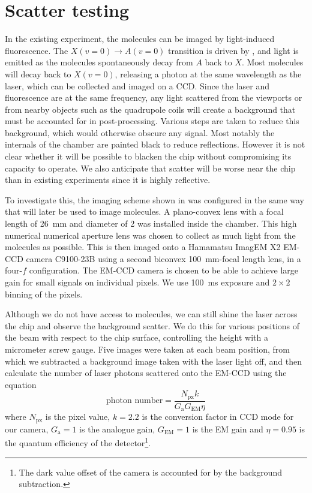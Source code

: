 \section{Scatter testing}
\label{exper:scatter}

In the existing \CaF{} experiment, the molecules can be imaged by light-induced
fluorescence.  The $X(v=0)\rightarrow A(v=0)$ transition is driven by
, and light is emitted as the molecules spontaneously decay from
$A$ back to $X$. Most molecules will decay back to $X(v=0)$, releasing a photon
at the same wavelength as the laser, which can be collected and imaged on a
CCD. Since the laser and fluorescence are at the same frequency, any light
scattered from the viewports or from nearby objects such as the quadrupole
coils will create a background that must be accounted for in post-processing.
Various steps are taken to reduce this background, which would otherwise
obscure any signal. Most notably the internals of the chamber are painted black
to reduce reflections. However it is not clear whether it will be possible to
blacken the chip without compromising its capacity to operate. We also
anticipate that scatter will be worse near the chip than in existing
experiments since it is highly reflective.

To investigate this, the imaging scheme shown in
 was configured in the same way that will later
be used to image molecules.  A plano-convex lens with a focal length of
\SI{26}{\milli\meter} and diameter of \SI{2}{\inch} was installed inside the
chamber. This high numerical numerical aperture lens was chosen to collect as
much light from the molecules as possible. This is then imaged onto a Hamamatsu
ImagEM X2 EM-CCD camera C9100-23B using a second biconvex
\SI{100}{\milli\meter}-focal length lens, in a four-$f$ configuration. The
EM-CCD camera is chosen to be able to achieve large gain for small signals on
individual pixels. We use \SI{100}{\milli\second} exposure and $2\times2$
binning of the pixels.

Although we do not have access to molecules, we can still shine the laser
across the chip and observe the background scatter. We do this for various
positions of the beam with respect to the chip surface, controlling the height
with a micrometer screw gauge. Five images were taken at each beam position,
from which we subtracted a background image taken with the laser light off, and
then calculate the number of laser photons scattered onto the EM-CCD using the
equation
%
\begin{equation}
  \text{photon number} = \frac{N_\text{px} k}{G_\text{a}
    G_\text{EM}\eta}
\end{equation}
%
where $N_\text{px}$ is the pixel value, $k=2.2$ is the conversion factor in CCD
mode for our camera, $G_\text{a}=1$ is the analogue gain,
$G_\text{EM}=1$ is the EM gain and $\eta=0.95$ is the quantum efficiency of the
detector\footnote{The dark value offset of the camera is accounted for by the 
background subtraction.}.

